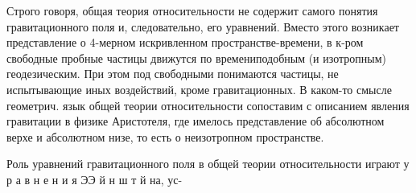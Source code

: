 \documentclass[10pt]{article}
\begin{document}
Строго говоря, общая теория относительности не содержит самого понятия гравитационного поля и, следовательно, его уравнений. Вместо этого возникает представление о 4-мерном искривленном пространстве-времени, в к-ром свободные пробные частицы движутся по времениподобным (и изотропным) геодезическим. При этом под свободными понимаются частицы, не испытывающие иных воздействий, кроме гравитационных. В каком-то смысле геометрич. язык общей теории относительности сопоставим с описанием явления гравитации в физике Аристотеля, где имелось представление об абсолютном верхе и абсолютном низе, то есть о неизотропном пространстве.



Роль уравнений гравитационного поля в общей теории относительности играют у р а в н е н и я ЭЭ й н ш т й на, ус-
\end{document}
